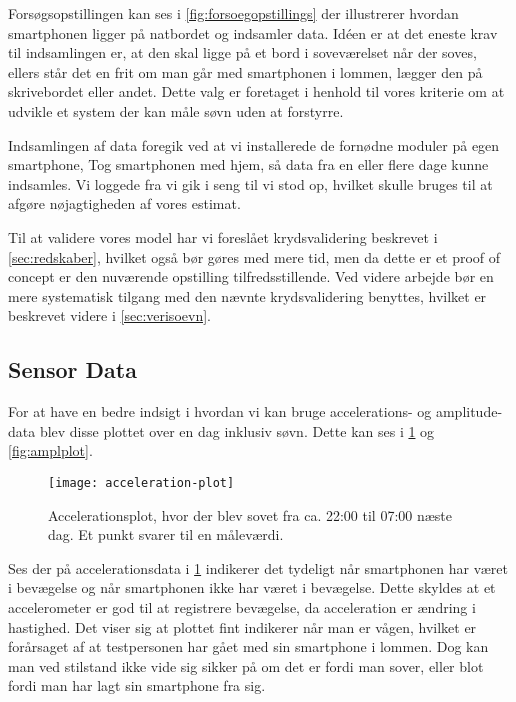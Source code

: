 Forsøgsopstillingen kan ses i \cref{fig:forsoegopstillings} der illustrerer hvordan smartphonen ligger på natbordet og indsamler data.
Idéen er at det eneste krav til indsamlingen er, at den skal ligge på et bord i soveværelset når der soves, ellers står det en frit om man går med smartphonen i lommen, lægger den på skrivebordet eller andet. 
Dette valg er foretaget i henhold til vores kriterie om at udvikle et system der kan måle søvn uden at forstyrre.

Indsamlingen af data foregik ved at vi installerede de fornødne moduler på egen smartphone, Tog smartphonen med hjem, så data fra en eller flere dage kunne indsamles.
Vi loggede fra vi gik i seng til vi stod op, hvilket skulle bruges til at afgøre nøjagtigheden af vores estimat.

Til at validere vores model har vi foreslået krydsvalidering beskrevet i \cref{sec:redskaber}, hvilket også bør gøres med mere tid, men da dette er et proof of concept er den nuværende opstilling tilfredsstillende.
Ved videre arbejde bør en mere systematisk tilgang med den nævnte krydsvalidering benyttes, hvilket er beskrevet videre i \cref{sec:verisoevn}.

\subsection{Sensor Data}
For at have en bedre indsigt i hvordan vi kan bruge accelerations- og amplitude-data blev disse plottet over en dag inklusiv søvn.
Dette kan ses i \cref{fig:accplot} og \cref{fig:amplplot}.

\begin{figure}[h]
	\centering
	\texttt{[image: acceleration-plot]}
	\caption{Accelerationsplot, hvor der blev sovet fra ca. 22:00 til 07:00 næste dag.  Et punkt svarer til en måleværdi.}\label{fig:accplot}
\end{figure}

Ses der på accelerationsdata i \cref{fig:accplot} indikerer det tydeligt når smartphonen har været i bevægelse og når smartphonen ikke har været i bevægelse.
Dette skyldes at et accelerometer er god til at registrere bevægelse, da acceleration er ændring i hastighed.
Det viser sig at plottet fint indikerer når man er vågen, hvilket er forårsaget af at testpersonen har gået med sin smartphone i lommen.
Dog kan man ved stilstand ikke vide sig sikker på om det er fordi man sover, eller blot fordi man har lagt sin smartphone fra sig.

